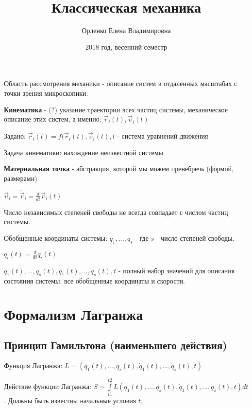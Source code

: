 \documentclass[a4paper,12pt]{report}
\author{Орленко Елена Владимировна}
\title{Классическая механика}
\date{2018 год, весенний семестр}
\begin{document}
\makeatletter
{}
\makeatother  

\maketitle

\newpage
\setcounter{section}{0}
Область рассмотрения механики - описание систем в отдаленных масштабах с точки зрения микроскопики.

\textbf{Кинематика} - (?) указание траектории всех частиц системы, механическое описание этих систем, а именно: $\vec{r}_i(t), \vec{\upsilon}_i(t)$

Задано: $\ddot{\vec{r}}_i(t)= f(\vec{r}_i(t), \vec{\upsilon}_i(t), t$ - система уравнений движения

Задача кинематики: нахождение неизвестной системы

\textbf{Материальная точка} - абстракция, которой мы можем пренебречь (формой, размерами)

$\vec{\upsilon}_i=\dot{\vec{r}}_i=\frac{d}{dt}\vec{r}_i(t)$

Число независимых степеней свободы не всегда совпадает с числом частиц системы.

Обобщенные координаты системы: $q_1, ..., q_s$ - где $s$ - число степеней свободы.

$\dot{q}_i(t)=\frac{d}{dt}q_i(t)$

$q_1(t), ..., q_s(t), \dot{q}_1(t), ..., \dot{q}_s(t), t$ - полный набор значений для описания состояния системы: все обобщенные координаты и скорости.

\section{Формализм Лагранжа}
\subsection{Принцип Гамильтона (наименьшего действия)}

Функция Лагранжа: $L=(q_1(t), ..., q_s(t), \dot{q}_1(t), ..., \dot{q}_s(t), t)$

Действие функции Лагранжа: $S=\int\limits^{t2}_{t1}L(q_1(t), ..., q_s(t), \dot{q}_1(t), ..., \dot{q}_s(t), t)dt$. Должны быть известны начальные условия $t_1$
\end{document}
